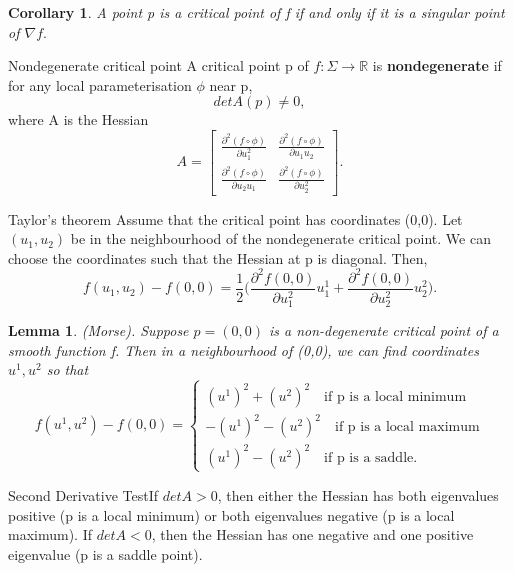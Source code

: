 \documentclass[twoside]{article}
\newtheorem{lemma}[theorem]{Lemma}
\newtheorem{corollary}[theorem]{Corollary}
\begin{document}
\begin{corollary}A point p is a critical point of f if and only if it is a singular point of $\nabla f.$
\end{corollary}

\begin{definition_exam}{Nondegenerate critical point}{} A critical point p of $f: \Sigma \rightarrow \mathbb{R}$ is \textbf{nondegenerate} if for any local parameterisation $\phi$ near p, 
$$
detA(p) \neq 0,
$$
where A is the Hessian
$$
A = \begin{bmatrix}
\frac{\partial^2 (f \circ \phi)}{\partial u_{1}^{2}} & \frac{\partial^2 (f \circ \phi)}{\partial u_{1}u_{2}} \\
\frac{\partial^2 (f \circ \phi)}{\partial u_{2}u_{1}} & \frac{\partial^2 (f \circ \phi)}{\partial u_{2}^2}
\end{bmatrix}.
$$
\end{definition_exam}

\begin{theorem_exam}{Taylor's theorem}{} Assume that the critical point has coordinates (0,0). Let $(u_1,u_2)$ be in the neighbourhood of the nondegenerate critical point. We can choose the coordinates such that the Hessian at p is diagonal. Then, 
$$
f(u_1,u_2) - f(0,0) = \frac{1}{2}\bigg( \frac{\partial^2 f(0,0)}{\partial u_1^2}u_1^1 + \frac{\partial^2 f(0,0)}{\partial u_2^2}u_2^2 \bigg).
$$
\end{theorem_exam}

\begin{lemma}(Morse). Suppose $p = (0,0)$ is a non-degenerate critical point of a smooth function f. Then in a neighbourhood of (0,0), we can find coordinates $u^1, u^2$ so that 
$$
f(u^1, u^2) - f(0, 0) = 
\begin{cases}
(u^1)^2 + (u^2)^2 \quad \text{if p is a local minimum}\\
-(u^1)^2 - (u^2)^2 \quad \text{if p is a local maximum}\\
(u^1)^2 - (u^2)^2 \quad \text{if p is a saddle.}
\end{cases}
$$
\end{lemma}


\begin{proposition_exam}{Second Derivative Test}{}If $det A > 0$, then either the Hessian has both eigenvalues positive (p is a local minimum) or both eigenvalues negative (p is a local maximum). If $det A < 0$, then the Hessian has one negative and one positive eigenvalue (p is a saddle point).
\end{proposition_exam}
\end{document}
